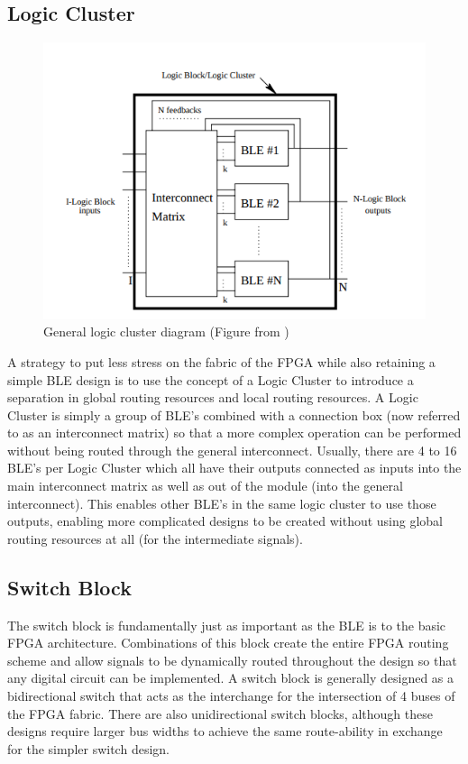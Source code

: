 \documentclass[12pt]{article}
\begin{document}
\subsection{Logic Cluster} \label{logicCluster}

\begin{figure}[ht]
  \centering
  \includegraphics[width=.7\textwidth]{logicclusterex}
  \caption{General logic cluster diagram (Figure from \cite{masud_1999})}
  \label{fig:logiccluster_ex}
\end{figure}

A strategy to put less stress on the fabric of the FPGA while also retaining a simple 
BLE design is to use the concept of a Logic Cluster to introduce a separation in 
global routing resources and local routing resources. A Logic Cluster is simply a 
group of BLE’s combined with a connection box (now referred to as an interconnect matrix)
so that a more complex operation 
can be performed without being routed through the general interconnect. Usually, 
there are 4 to 16 BLE’s per Logic Cluster \cite{masud_1999} which all have their outputs connected 
as inputs into the main interconnect matrix as well as out of the module (into the 
general interconnect). This enables other BLE’s in the same logic cluster to use 
those outputs, enabling more complicated designs to be created without using global 
routing resources at all (for the intermediate signals).

\subsection{Switch Block}
The switch block is fundamentally just as important as the BLE is to the basic FPGA 
architecture. Combinations of this block create the entire FPGA routing scheme and 
allow signals to be dynamically routed throughout the design so that any digital 
circuit can be implemented. A switch block is generally designed as a bidirectional 
switch that acts as the interchange for the intersection of 4 buses of the FPGA fabric.
There are also unidirectional switch blocks, although these designs require larger 
bus widths to achieve the same route-ability in exchange for the simpler switch design.
\end{document}
